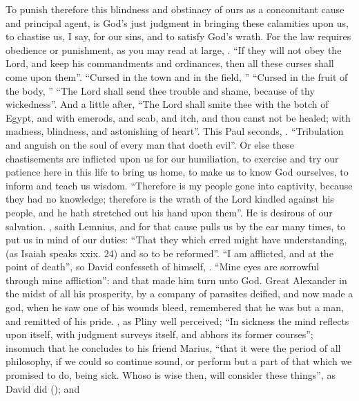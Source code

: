 To punish therefore this blindness and obstinacy of ours as a concomitant cause
and principal agent, is God's just judgment in bringing these calamities upon
us, to chastise us, I say, for our sins, and to satisfy God's wrath. For the
law requires obedience or punishment, as you may read at large, . \enquote{If they will not obey the Lord, and keep his commandments
and ordinances, then all these curses shall come upon them}.
\enquote{Cursed in the town and in the field, \etc{}}
\enquote{Cursed in the fruit of the body, \etc{}}
\enquote{The Lord shall send thee trouble and shame, because of thy
wickedness}. And a little after, \enquote{The Lord shall smite thee
with the botch of Egypt, and with emerods, and scab, and itch, and thou canst
not be healed; with madness, blindness, and astonishing of
heart}. This Paul seconds, . \enquote{Tribulation and anguish
on the soul of every man that doeth evil}. Or else these chastisements are
inflicted upon us for our humiliation, to exercise and try our patience here in
this life to bring us home, to make us to know God ourselves, to inform and
teach us wisdom. \enquote{Therefore is my people gone into
captivity, because they had no knowledge; therefore is the wrath of the Lord
kindled against his people, and he hath stretched out his hand upon them}. He
is desirous of our salvation. ,
saith Lemnius, and for that cause pulls us by the ear many times, to put us in
mind of our duties: \enquote{That they which erred might have understanding, (as Isaiah
speaks xxix. 24) and so to be reformed}. \enquote{I am afflicted,
and at the point of death}, so David confesseth of himself, . \enquote{Mine eyes are sorrowful through mine
affliction}: and that made him turn unto God. Great Alexander in the midst of
all his prosperity, by a company of parasites deified, and now made a god, when
he saw one of his wounds bleed, remembered that he was but a man, and remitted
of his pride. , as
Pliny well perceived; \enquote{In sickness the mind reflects upon
itself, with judgment surveys itself, and abhors its former courses}; insomuch
that he concludes to his friend Marius, \enquote{that it were the
period of all philosophy, if we could so continue sound, or perform but a part
of that which we promised to do, being sick. Whoso is wise then, will consider
these things}, as David did (); and
